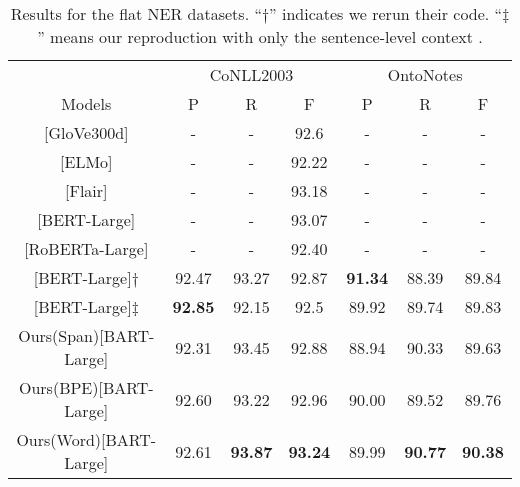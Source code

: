 \documentclass[11pt,a4paper]{article}
\begin{document}
\begin{table*}[ht]
  \centering
  \setlength{\tabcolsep}{2pt}
  \begin{tabular}{c|ccc|ccc}
\toprule
     & \multicolumn{3}{c|}{CoNLL2003} & \multicolumn{3}{c}{OntoNotes} \\
  Models  & P        & R        & F       & P        & R        & F       \\
\midrule
  \citet{DBLP:conf/emnlp/ClarkLML18}[GloVe300d]                      & -        & -        & 92.6    &    -     &      -   &     -    \\
  \citet{DBLP:conf/naacl/PetersNIGCLZ18}[ELMo] & - & - & 92.22 & - & - & - \\
  \citet{DBLP:conf/naacl/AkbikBV19}[Flair] & -  & - & 93.18 & - & - & - \\
  \citet{DBLP:conf/acl/StrakovaSH19}[BERT-Large] & -        & -        & 93.07   &      -   &       -  &    -     \\
  \citet{DBLP:conf/emnlp/YamadaASTM20}[RoBERTa-Large] & -        & -        & 92.40   &      -   &       -  &    -     \\
  \citet{DBLP:conf/acl/LiFMHWL20}[BERT-Large]$\dagger$ &  92.47 & 93.27 & 92.87 &  \textbf{91.34} & 88.39 & 89.84 \\
  \citet{DBLP:conf/acl/YuBP20}[BERT-Large]$\ddagger$            & \textbf{92.85}    & 92.15    & 92.5    & 89.92    & 89.74    & 89.83   \\
  \midrule
  Ours(Span)[BART-Large]    & 92.31    & 93.45    & 92.88   & 88.94    & 90.33    & 89.63   \\
  Ours(BPE)[BART-Large]  & 92.60    & 93.22    & 92.96   & 90.00    & 89.52    & 89.76   \\
  Ours(Word)[BART-Large]    & 92.61    & \textbf{93.87}    & \textbf{93.24}   & 89.99    & \textbf{90.77}    & \textbf{90.38}   \\
  \bottomrule
  \end{tabular}
  \caption{Results for the flat NER datasets. ``$\dagger$'' indicates we rerun their code. ``$\ddagger$'' means our reproduction with only the sentence-level context \protect\footnotemark. }
  \label{tb:flat_ner}
\end{table*}
\end{document}

